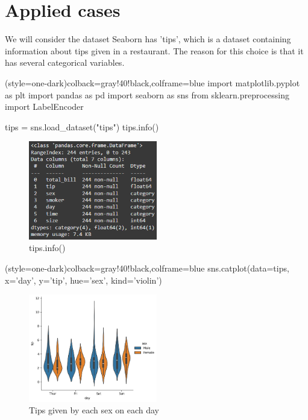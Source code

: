 \documentclass[10pt]{extarticle}
\begin{document}
\section{Applied cases}

We will consider the dataset Seaborn has 'tips', which is a dataset containing information about tips given in a restaurant. The reason for this choice is that it has several categorical variables.

\begin{python}[tips](style=one-dark){colback=gray!40!black,colframe=blue}
import matplotlib.pyplot as plt
import pandas as pd
import seaborn as sns
from sklearn.preprocessing import LabelEncoder

tips = sns.load_dataset("tips")
tips.info()
\end{python}

\begin{figure}[H]
    \centering
    \includegraphics[width=0.5\textwidth]{img/info_tips.png} 
    \caption{tips.info()}
    \label{fig:imagen}
\end{figure}

\begin{python}[tips](style=one-dark){colback=gray!40!black,colframe=blue}
sns.catplot(data=tips, x='day', y='tip', hue='sex', kind='violin')
\end{python}

\begin{figure}[H]
    \centering
    \includegraphics[width=0.5\textwidth]{img/catplot_3.png} 
    \caption{Tips given by each sex on each day}
    \label{fig:imagen}
\end{figure}
\end{document}
